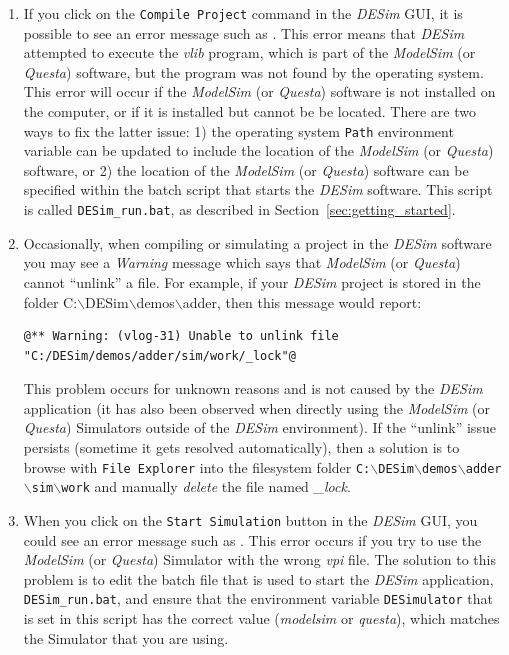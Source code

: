 {\begin{enumerate}
\item If you click on the \texttt{Compile Project} command in the {\it DESim} GUI, it is
possible to see an error message such as 
. This error means that
{\it DESim} attempted to execute the {\it vlib} program, which is part of the 
{\it ModelSim} (or {\it Questa}) software, but the program was not found by the
operating system. This error will occur if the {\it ModelSim} (or {\it Questa}) software 
is not installed on the computer, or if it is installed but cannot be be located. There are 
two ways to fix the latter issue: 1) the operating system \texttt{Path} environment variable 
can be updated to include the location of the {\it ModelSim} (or {\it Questa}) software, 
or 2) the location of the {\it ModelSim} (or {\it Questa}) software can be specified within 
the batch script that starts the {\it DESim} software. This script is called 
\texttt{DESim\_run.bat}, as described in Section~\ref{sec:getting_started}.

\item Occasionally, when compiling or simulating a project in the {\it DESim} software you may
see a {\it Warning} message which says that {\it ModelSim} (or {\it Questa}) cannot 
``unlink'' a file.  For example, if your {\it DESim} project is stored in the folder
C:$\backslash$DESim$\backslash$demos$\backslash$adder, then this message would report: 

\noindent
\begin{minipage}[h]{18 cm}
\begin{lstlisting}[]
@** Warning: (vlog-31) Unable to unlink file "C:/DESim/demos/adder/sim/work/_lock"@
\end{lstlisting}
\end{minipage}

This problem occurs for unknown reasons and is not caused by the {\it DESim} application 
(it has also been observed when directly using the {\it ModelSim} (or {\it Questa}) Simulators
outside of the {\it DESim} environment). 
If the ``unlink'' issue persists (sometime it gets resolved 
automatically), then a solution is to browse with \texttt{File Explorer} into the filesystem
folder  
\texttt{C:$\backslash$DESim$\backslash$demos$\backslash$adder$\backslash$sim$\backslash$work}
and manually {\it delete} the file named {\it \_lock}.

\item When you click on the \texttt{Start Simulation} button in the {\it DESim} GUI,
you could see an error message such as .
This error occurs if you try to use the {\it ModelSim} (or {\it Questa}) Simulator with
the wrong {\it vpi} file.  The solution to this problem is to edit the batch file that is
used to start the {\it DESim} application, \texttt{DESim\_run.bat}, and ensure that the
environment variable \texttt{DESimulator} that is set in this script has the correct value
({\it modelsim} or {\it questa}), which matches the Simulator that you are using.


\end{enumerate}}
